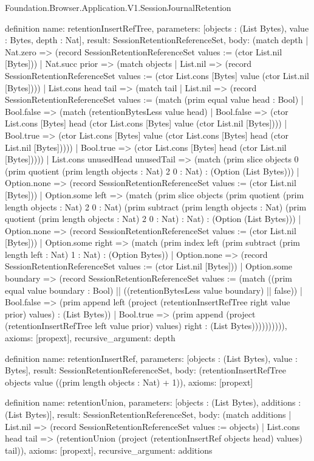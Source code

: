 \begin{lexlean}{Foundation.Browser.Application.V1.SessionJournalRetention}
\begin{semanticmodule}
definition{
  name: retentionInsertRefTree,
  parameters: [objects : (List Bytes), value : Bytes, depth : Nat],
  result: SessionRetentionReferenceSet,
  body: (match depth
    | Nat.zero => (record SessionRetentionReferenceSet {values := (ctor List.nil [Bytes])})
    | Nat.succ prior => (match objects
      | List.nil => (record SessionRetentionReferenceSet {values := (ctor List.cons [Bytes] value (ctor List.nil [Bytes]))})
      | List.cons head tail => (match tail
        | List.nil => (record SessionRetentionReferenceSet {values := (match (prim equal value head : Bool)
          | Bool.false => (match (retentionBytesLess value head)
            | Bool.false => (ctor List.cons [Bytes] head (ctor List.cons [Bytes] value (ctor List.nil [Bytes])))
            | Bool.true => (ctor List.cons [Bytes] value (ctor List.cons [Bytes] head (ctor List.nil [Bytes]))))
          | Bool.true => (ctor List.cons [Bytes] head (ctor List.nil [Bytes])))})
        | List.cons unusedHead unusedTail => (match (prim slice objects 0 (prim quotient (prim length objects : Nat) 2 0 : Nat) : (Option (List Bytes)))
          | Option.none => (record SessionRetentionReferenceSet {values := (ctor List.nil [Bytes])})
          | Option.some left => (match (prim slice objects (prim quotient (prim length objects : Nat) 2 0 : Nat) (prim subtract (prim length objects : Nat) (prim quotient (prim length objects : Nat) 2 0 : Nat) : Nat) : (Option (List Bytes)))
            | Option.none => (record SessionRetentionReferenceSet {values := (ctor List.nil [Bytes])})
            | Option.some right => (match (prim index left (prim subtract (prim length left : Nat) 1 : Nat) : (Option Bytes))
              | Option.none => (record SessionRetentionReferenceSet {values := (ctor List.nil [Bytes])})
              | Option.some boundary => (record SessionRetentionReferenceSet {values := (match ((prim equal value boundary : Bool) || ((retentionBytesLess value boundary) || false))
                | Bool.false => (prim append left (project (retentionInsertRefTree right value prior) values) : (List Bytes))
                | Bool.true => (prim append (project (retentionInsertRefTree left value prior) values) right : (List Bytes)))}))))))),
  axioms: [propext],
  recursive_argument: depth
}

definition{
  name: retentionInsertRef,
  parameters: [objects : (List Bytes), value : Bytes],
  result: SessionRetentionReferenceSet,
  body: (retentionInsertRefTree objects value ((prim length objects : Nat) + 1)),
  axioms: [propext]
}

definition{
  name: retentionUnion,
  parameters: [objects : (List Bytes), additions : (List Bytes)],
  result: SessionRetentionReferenceSet,
  body: (match additions
    | List.nil => (record SessionRetentionReferenceSet {values := objects})
    | List.cons head tail => (retentionUnion (project (retentionInsertRef objects head) values) tail)),
  axioms: [propext],
  recursive_argument: additions
}


\end{semanticmodule}
\end{lexlean}
